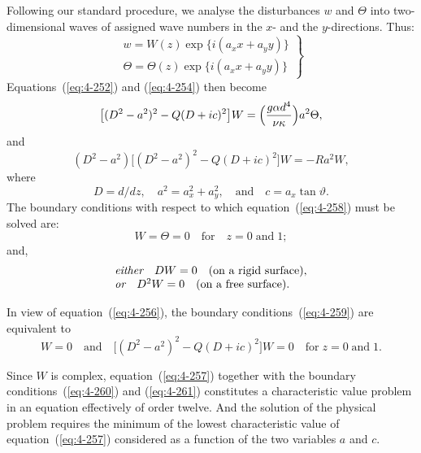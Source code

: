 Following our standard procedure, we analyse the disturbances $w$ and $\Theta$ into two-dimensional waves of assigned wave numbers in the $x$- and the $y$-directions. Thus:
\begin{equation}
\label{eq:4-255}
\left.\begin{array}{l}
w = W(z)\exp\{i(a_x x+a_y y)\} \\
\Theta = \Theta(z)\exp\{i(a_x x+a_y y)\}
\end{array}\right\}
\end{equation}
Equations~(\ref{eq:4-252}) and (\ref{eq:4-254}) then become
\begin{equation}
\label{eq:4-256}
\bigl[(D^2-a^2)^2-Q(D+ic)^2\bigr]W = \Bigl(\frac{g\alpha d^4}{\nu\kappa}\Bigr)a^2\Theta,
\end{equation}
and
\begin{equation}
\label{eq:4-257}
(D^2-a^2)\bigl[(D^2-a^2)^2-Q(D+ic)^2\bigr]W = -Ra^2 W,
\end{equation}
where
\begin{equation}
\label{eq:4-258}
D = d/dz, \quad a^2 = a_x^2+a_y^2, \quad\text{and}\quad c = a_x\tan\vartheta.
\end{equation}
The boundary conditions with respect to which equation~(\ref{eq:4-258}) must be solved are:
\begin{equation}
\label{eq:4-259}
W = \Theta = 0 \quad \text{for}\quad z = 0\;\text{and}\;1;
\end{equation}
and,
\begin{equation}
\label{eq:4-260}
\left.\begin{array}{l}
\emph{either}\quad DW = 0\quad\text{(on a rigid surface),}\\
\emph{or}\quad D^2 W = 0\quad\text{(on a free surface).}
\end{array}\right.
\end{equation}

In view of equation~(\ref{eq:4-256}), the boundary conditions~(\ref{eq:4-259}) are equivalent to
\begin{equation}
\label{eq:4-261}
W = 0 \quad\text{and}\quad \bigl[(D^2-a^2)^2-Q(D+ic)^2\bigr]W = 0 \quad \text{for}\;z = 0\;\text{and}\;1.
\end{equation}

Since $W$ is complex, equation~(\ref{eq:4-257}) together with the boundary conditions~(\ref{eq:4-260}) and (\ref{eq:4-261}) constitutes a characteristic value problem in an equation effectively of order twelve. And the solution of the physical problem requires the minimum of the lowest characteristic value of equation~(\ref{eq:4-257}) considered as a function of the two variables $a$ and $c$.

